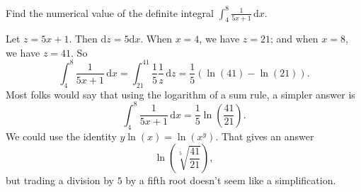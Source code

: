 \documentclass[12pt,fleqn,answers]{exam}
\begin{document}
\begin{questions}

\newpage 
\question Find the numerical value of the definite integral 
$\int_4^8 \frac{1}{5 x + 1} \, \mathrm{d} x$.

\begin{solution}
Let $z = 5 x + 1$. Then $\mathrm{d} z = 5 \mathrm{d} x$. When $x=4$, 
we have $z = 21$; and when $x=8$, we have $z = 41$. So
\begin{equation}
    \int_4^8 \frac{1}{5 x + 1} \, \mathrm{d} x
    = \int_{21}^{41} \frac{1}{5} \frac{1}{z} \, \mathrm{d} z
    = \frac{1}{5} \left( \ln(41) - \ln(21) \right).
\end{equation}
Most folks would say that using the logarithm of a sum rule, a 
simpler answer is
\begin{equation}
    \int_4^8 \frac{1}{5 x + 1} \, \mathrm{d} x
     = \frac{1}{5}  \ln\left( \frac{41}{21} \right).
\end{equation}
We could use the identity $y \ln(x) = \ln(x^y)$. That gives an answer
\begin{equation}
   \ln\left( \sqrt[5]{\frac{41}{21}} \right),
\end{equation}
but trading a division by $5$ by a fifth root doesn't seem like a 
simplification.
\end{solution}

\end{questions}
\end{document}
